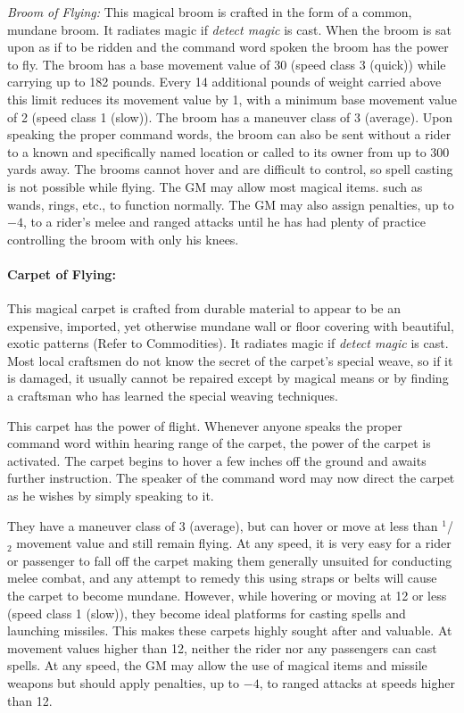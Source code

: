 \begin{multicols}{2}
\textit{Broom of Flying:}  This magical broom is crafted in the form of a common, mundane broom.  It radiates magic if \textit{detect magic} is cast.  When the broom is sat upon as if to be ridden and the command word spoken the broom has the power to fly.  The broom has a base movement value of 30 (speed class 3 (quick)) while carrying up to 182 pounds.  Every 14 additional pounds of weight carried above this limit reduces its movement value by 1, with a minimum base movement value of 2 (speed class 1 (slow)).  The broom has a maneuver class of 3 (average).  Upon speaking the proper command words, the broom can also be sent without a rider to a known and specifically named location or called to its owner from up to 300 yards away.  The brooms cannot hover and are difficult to control, so spell casting is not possible while flying.  The GM may allow most magical items. such as wands, rings, etc., to function normally.  The GM may also assign penalties, up to $-4$, to a rider's melee and ranged attacks until he has had plenty of practice controlling the broom with only his knees.

\paragraph{Carpet of Flying:} This magical carpet is crafted from durable material to appear to be an expensive, imported, yet otherwise mundane wall or floor covering with beautiful, exotic patterns (Refer to Commodities).  It radiates magic if \textit{detect magic} is cast.  Most local craftsmen do not know the secret of the carpet's special weave, so if it is damaged, it usually cannot be repaired except by magical means or by finding a craftsman who has learned the special weaving techniques.

This carpet has the power of flight.  Whenever anyone speaks the proper command word within hearing range of the carpet, the power of the carpet is activated.  The carpet begins to hover a few inches off the ground and awaits further instruction.  The speaker of the command word may now direct the carpet as he wishes by simply speaking to it.  

They have a maneuver class of 3 (average), but can hover or move at less than $^1$/$_2$ movement value and still remain flying.  At any speed, it is very easy for a rider or passenger to fall off the carpet making them generally unsuited for conducting melee combat, and any attempt to remedy this using straps or belts will cause the carpet to become mundane.  However, while hovering or moving at 12 or less (speed class 1 (slow)), they become ideal platforms for casting spells and launching missiles.  This makes these carpets highly sought after and valuable.  At movement values higher than 12, neither the rider nor any passengers can cast spells.  At any speed, the GM may allow the use of magical items and missile weapons but should apply penalties, up to $-4$, to ranged attacks at speeds higher than 12.    


\end{multicols}
